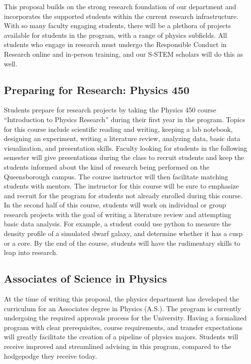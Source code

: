 \documentclass[12pt]{article}
\begin{document}
This proposal builds on the strong research foundation of our department and incorporates the supported students within the current research infrastructure.  With so many faculty engaging students, there will be a plethora of projects available for students in the program, with a range of physics subfields.  All students who engage in research must undergo the Responsible Conduct in Research online and in-person training, and our S-STEM scholars will do this as well.

\subsection{Preparing for Research: Physics 450}
Students prepare for research projects by taking the Physics 450 course ``Introduction to Physics Research'' during their first year in the program.   Topics for this course include scientific reading and writing, keeping a lab notebook, designing an experiment, writing a literature review, analyzing data, basic data visualization, and presentation skills.  Faculty looking for students in the following semester will give presentations during the class to recruit students and keep the students informed about the kind of research being performed on the Queensborough campus.  The course instructor will then facilitate matching students with mentors.  The instructor for this course will be sure to emphasize and recruit for the program for students not already enrolled during this course.  In the second half of this course, students will work on individual or group research projects with the goal of writing a literature review and attempting basic data analysis.  For example, a student could use python to measure the density profile of a simulated dwarf galaxy, and determine whether it has a cusp or a core.  By the end of the course, students will have the rudimentary skills to leap into research.  

\subsection{Associates of Science in Physics}
At the time of writing this proposal, the physics department has developed the curriculum for an Associates degree in Physics (A.S.).  The program is currently undergoing the required approvals process for the University.  Having a formalized program with clear prerequisites, course requirements, and transfer expectations will greatly facilitate the creation of a pipeline of physics majors.  Students will receive improved and streamlined advising in this program, compared to the hodgepodge they receive today.  
\end{document}
